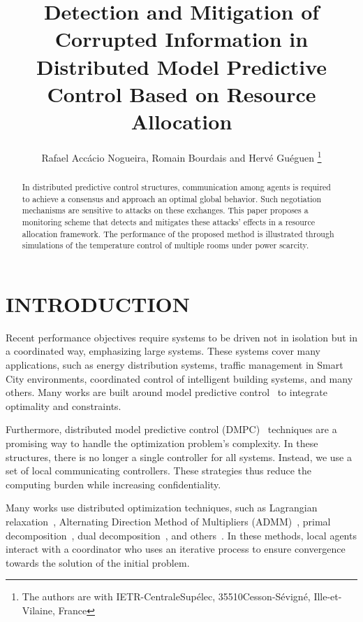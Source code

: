 \documentclass[a4paper, 10 pt, conference]{ieeeconf}  %
\title{\LARGE \bf
Detection and Mitigation of Corrupted Information in Distributed Model Predictive Control Based on Resource Allocation
}
\author{Rafael Accácio Nogueira, Romain Bourdais and Hervé Guéguen
\thanks{The authors are with IETR-CentraleSupélec, 35510\newline Cesson-Sévigné, Ille-et-Vilaine, France \newline {\tt\small
\{rafael-accacio.nogueira, romain.bourdais, herve.gueguen\}
@centralesupelec.fr}\newline
}%
}
\begin{document}
\maketitle

\begin{abstract}
  In distributed predictive control structures, communication among agents is required to achieve a consensus and approach an optimal global behavior. Such negotiation mechanisms are sensitive to attacks on these exchanges.
  This paper proposes a monitoring scheme that detects and mitigates these attacks' effects in a resource allocation framework.
  The performance of the proposed method is illustrated through simulations of the temperature control of multiple rooms under power scarcity.
\end{abstract}

\section{INTRODUCTION}
Recent performance objectives require systems to be driven not in isolation but
in a coordinated way, emphasizing large systems.
These systems cover many applications, such as energy distribution systems,
traffic management in Smart City environments, coordinated control of
intelligent building systems, and many others.
Many works are built around model predictive control~\cite{CamachoBordons2007} to integrate optimality and constraints.

Furthermore, distributed model predictive control (DMPC)~\cite{MaestreEtAl2014}
techniques are a promising way to handle the optimization problem's complexity.
In these structures, there is no longer a single controller for all systems.
Instead, we use a set of local communicating controllers.
These strategies thus reduce the computing burden while increasing
confidentiality.

Many works use distributed optimization techniques, such as
Lagrangian relaxation~\cite{BourdaisEtAl2012}, Alternating Direction Method of
Multipliers (ADMM)~\cite{BoydEtAl2011}, primal
decomposition~\cite{PaulenEtAl2016}, dual decomposition~\cite{VelardeEtAl2017,VelardeEtAl2017a,PflaumEtAl2014}, and others~\cite{ChanfreutEtAl2018,Cohen1978}.
In these methods, local agents interact with a coordinator who uses an iterative process to ensure convergence towards the solution of the initial
problem.
\end{document}
